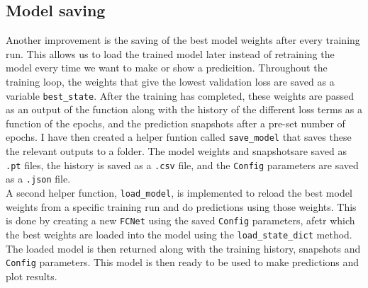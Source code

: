 \documentclass[we,twoside,openright,a4paper,11pt]{uantwerpenbamathesis}
\begin{document}
\subsection{Model saving}
Another improvement is the saving of the best model weights after every training run. This allows us to load the trained model later instead of retraining the model every time we want to make or show a predicition. Throughout the training loop, the weights that give the lowest validation loss are saved as a variable \verb|best_state|. After the training has completed, these weights are passed as an output of the function along with the history of the different loss terms as a function of the epochs, and the prediction snapshots after a pre-set number of epochs. I have then created a helper funtion called \verb|save_model| that saves these the relevant outputs to a folder. The model weights and snapshotsare saved as \verb|.pt| files, the history is saved as a \verb|.csv| file, and the \verb|Config| parameters are saved as a \verb|.json| file.\\

A second helper function, \verb|load_model|, is implemented to reload the best model weights from a specific training run and do predictions using those weights. This is done by creating a new \verb|FCNet| using the saved \verb|Config| parameters, afetr which the best weights are loaded into the model using the \verb|load_state_dict| method. The loaded model is then returned along with the training history, snapshots and \verb|Config| parameters. This model is then ready to be used to make predictions and plot results.
\end{document}
